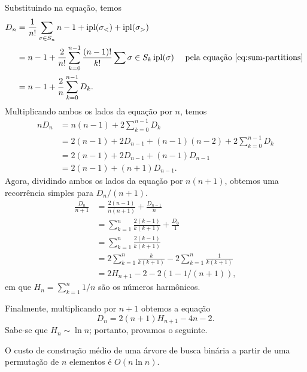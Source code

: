 Substituindo na equação, temos
\begin{align*}
    D_n &= \frac{1}{n!} \sum_{\sigma \in S_n} n-1 + \operatorname{ipl}(\sigma_<) + \operatorname{ipl}(\sigma_>) \\
        &= n-1 + \frac{2}{n!} \sum_{k=0}^{n-1} \frac{(n-1)!}{k!}
            \sum{\sigma \in S_k} \operatorname{ipl}(\sigma) & \text{
            pela equação~\ref{eq:sum-partitions}
        } \\
        &= n-1 + \frac 2 n \sum_{k=0}^{n-1} D_k.
\end{align*}
Multiplicando ambos os lados da equação por $n$, temos
\begin{align*}
    nD_n &= n(n-1) + 2 \sum_{k=0}^{n-1} D_k \\
         &= 2(n-1) + 2 D_{n-1} + (n-1)(n-2) + 2\sum_{k=0}^{n-1} D_k \\
         &= 2(n-1) + 2 D_{n-1} + (n-1)D_{n-1} \\
         &= 2(n-1) + (n+1) D_{n-1}.
\end{align*}
Agora, dividindo ambos os lados da equação por $n(n+1)$,
obtemos uma recorrência simples para $D_n/(n+1)$.
\begin{align*}
    \frac{D_n}{n+1} &= \frac{2(n-1)}{n(n+1)} + \frac{D_{n-1}}{n} \\
        &= \sum_{k=1}^n \frac{2(k-1)}{k(k+1)} + \frac{D_0}{1} \\
        &= \sum_{k=1}^n \frac{2(k-1)}{k(k+1)} \\
        &= 2\sum_{k=1}^n \frac{k}{k(k+1)} - 2 \sum_{k=1}^n \frac{1}{k(k+1)} \\
        &= 2H_{n+1} - 2 - 2(1 - 1/(n+1)),
\end{align*}
em que $H_n = \sum_{k=1}^n 1/n$ são os números harmônicos.

Finalmente, multiplicando por $n+1$ obtemos a equação
\begin{equation}
    D_n = 2(n+1)H_{n+1} - 4n - 2.
    \label{eq:construction-cost}
\end{equation}
Sabe-se que $H_n \sim \ln n$; portanto, provamos o seguinte.

\begin{proposition}
    O custo de construção médio de uma árvore de busca binária
    a partir de uma permutação de $n$ elementos é $O(n \ln n)$.
    \label{thm:construction-cost}
\end{proposition}

